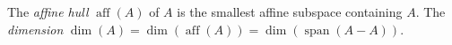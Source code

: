 The \emph{affine hull} $\operatorname{aff}(A)$ of $A$ is the smallest affine subspace containing $A$. The \emph{dimension} $\dim(A) = \dim(\operatorname{aff}(A)) = \dim(\operatorname{span}(A - A))$.
